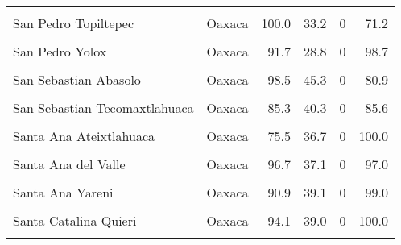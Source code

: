 \documentclass[
]{report}
\begin{document}
\begin{longtable}[t]{llrrrr}
\cellcolor{gray!6}{San Pedro Tidaa} & \cellcolor{gray!6}{Oaxaca} & \cellcolor{gray!6}{97.3} & \cellcolor{gray!6}{32.6} & \cellcolor{gray!6}{0} & \cellcolor{gray!6}{87.6}\\
San Pedro Topiltepec & Oaxaca & 100.0 & 33.2 & 0 & 71.2\\
\addlinespace
\cellcolor{gray!6}{San Pedro Yaneri} & \cellcolor{gray!6}{Oaxaca} & \cellcolor{gray!6}{90.6} & \cellcolor{gray!6}{46.4} & \cellcolor{gray!6}{0} & \cellcolor{gray!6}{99.1}\\
San Pedro Yolox & Oaxaca & 91.7 & 28.8 & 0 & 98.7\\
\cellcolor{gray!6}{San Pedro Y San Pablo Teposcolula} & \cellcolor{gray!6}{Oaxaca} & \cellcolor{gray!6}{97.8} & \cellcolor{gray!6}{41.0} & \cellcolor{gray!6}{0} & \cellcolor{gray!6}{53.6}\\
San Sebastian Abasolo & Oaxaca & 98.5 & 45.3 & 0 & 80.9\\
\cellcolor{gray!6}{San Sebastian Rio Hondo} & \cellcolor{gray!6}{Oaxaca} & \cellcolor{gray!6}{92.6} & \cellcolor{gray!6}{40.3} & \cellcolor{gray!6}{0} & \cellcolor{gray!6}{60.8}\\
\addlinespace
San Sebastian Tecomaxtlahuaca & Oaxaca & 85.3 & 40.3 & 0 & 85.6\\
\cellcolor{gray!6}{San Sebastian Teitipac} & \cellcolor{gray!6}{Oaxaca} & \cellcolor{gray!6}{91.5} & \cellcolor{gray!6}{45.7} & \cellcolor{gray!6}{0} & \cellcolor{gray!6}{66.0}\\
Santa Ana Ateixtlahuaca & Oaxaca & 75.5 & 36.7 & 0 & 100.0\\
\cellcolor{gray!6}{Santa Ana Cuauhtemoc} & \cellcolor{gray!6}{Oaxaca} & \cellcolor{gray!6}{86.2} & \cellcolor{gray!6}{32.9} & \cellcolor{gray!6}{0} & \cellcolor{gray!6}{96.1}\\
Santa Ana del Valle & Oaxaca & 96.7 & 37.1 & 0 & 97.0\\
\addlinespace
\cellcolor{gray!6}{Santa Ana Tavela} & \cellcolor{gray!6}{Oaxaca} & \cellcolor{gray!6}{96.0} & \cellcolor{gray!6}{31.2} & \cellcolor{gray!6}{0} & \cellcolor{gray!6}{52.5}\\
Santa Ana Yareni & Oaxaca & 90.9 & 39.1 & 0 & 99.0\\
\cellcolor{gray!6}{Santa Ana Zegache} & \cellcolor{gray!6}{Oaxaca} & \cellcolor{gray!6}{95.0} & \cellcolor{gray!6}{45.7} & \cellcolor{gray!6}{0} & \cellcolor{gray!6}{77.6}\\
Santa Catalina Quieri & Oaxaca & 94.1 & 39.0 & 0 & 100.0\\
\cellcolor{gray!6}{Santa Catarina Cuixtla} & \cellcolor{gray!6}{Oaxaca} & \cellcolor{gray!6}{95.9} & \cellcolor{gray!6}{38.8} & \cellcolor{gray!6}{0} & \cellcolor{gray!6}{76.7}\\

\end{longtable}
\end{document}
